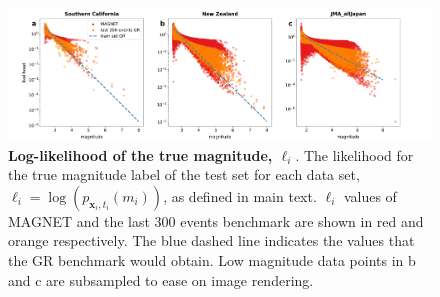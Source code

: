 \documentclass[pdflatex]{sn-jnl}
\begin{document}
\newpage
\begin{figure}[h!]
    \centering
    \includegraphics[width=1\textwidth]{figures/likelihood_scatter.png}
    \caption{
    \textbf{Log-likelihood of the true magnitude, $\ell_i$}. The likelihood for the true magnitude label of the test set for each data set, $\ell_i=\log\left(p_{\textbf{x}_i, t_i}(m_i)\right)$, as defined in main text. $\ell_i$ values of MAGNET and the last 300 events benchmark are shown in red and orange respectively. The blue dashed line indicates the values that the GR benchmark would obtain. Low magnitude data points in b and c are subsampled to ease on image rendering.
    }
    \label{fig:labels_likelihood}
\end{figure}
\end{document}
